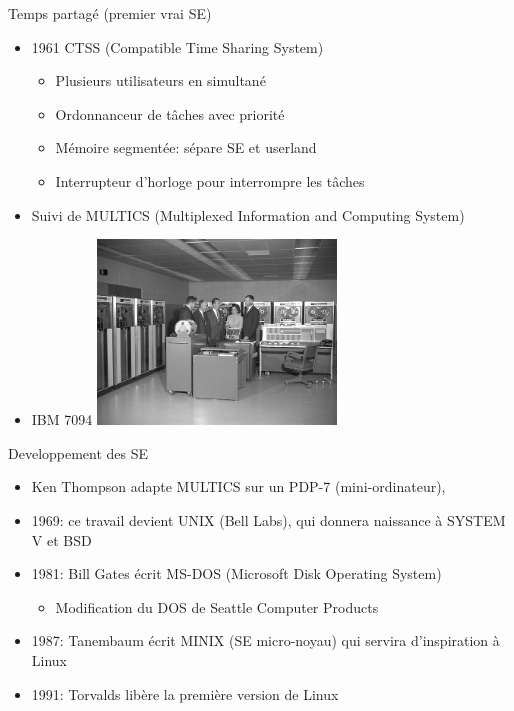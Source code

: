\documentclass[11pt]{beamer}
\begin{document}
\begin{frame}{Temps partagé (premier vrai SE)}

\begin{itemize}
\item
  1961 CTSS (Compatible Time Sharing System)

  \begin{itemize}
  \itemsep1pt\parskip0pt
  \item
    Plusieurs utilisateurs en simultané
  \item
    Ordonnanceur de tâches avec priorité
  \item
    Mémoire segmentée: sépare SE et userland
  \item
    Interrupteur d'horloge pour interrompre les tâches
  \end{itemize}
\item
  Suivi de MULTICS (Multiplexed Information and Computing System)
\item
  IBM 7094 \centering
  \includegraphics[width=0.5\textwidth]{figs/IBM7094.jpg}
\end{itemize}

\end{frame}

\begin{frame}{Developpement des SE}

\begin{itemize}
\itemsep1pt\parskip0pt
\item
  Ken Thompson adapte MULTICS sur un PDP-7 (mini-ordinateur),
\item
  1969: ce travail devient UNIX (Bell Labs), qui donnera naissance à
  SYSTEM V et BSD
\item
  1981: Bill Gates écrit MS-DOS (Microsoft Disk Operating System)

  \begin{itemize}
  \itemsep1pt\parskip0pt
  \item
    Modification du DOS de Seattle Computer Products
  \end{itemize}
\item
  1987: Tanembaum écrit MINIX (SE micro-noyau) qui servira d'inspiration
  à Linux
\item
  1991: Torvalds libère la première version de Linux
\end{itemize}

\end{frame}
\end{document}
